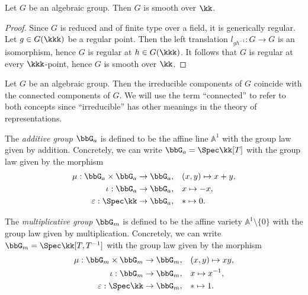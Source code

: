     \begin{proposition}\label{prop:algebraic_group_is_smooth}
        Let \(G\) be an algebraic group.
        Then \(G\) is smooth over \(\kk\).
    \end{proposition}
    \begin{proof}
        Since \(G\) is reduced and of finite type over a field, it is generically regular.
        Let \(g \in G(\kkk)\) be a regular point.
        Then the left translation \(l_{gh^{-1}}: G \to G\) is an isomorphism, hence \(G\) is regular at \(h \in G(\kkk)\).
        It follows that \(G\) is regular at every \(\kkk\)-point, hence \(G\) is smooth over \(\kk\).
    \end{proof}

    \begin{remark}\label{rmk:irreducible_and_connected_components_of_algebraic_group}
        Let \(G\) be an algebraic group.
        Then the irreducible components of \(G\) coincide with the connected components of \(G\).
        We will use the term ``connected'' to refer to both concepts since ``irreducible'' has other meanings in the theory of representations.
    \end{remark}

    \begin{example}\label{eg:additive_group}
        The \emph{additive group} $\bbG_a$ is defined to be the affine line $\mathbb{A}^1$ with the group law given by addition.
        Concretely, we can write $\bbG_a = \Spec \kk[T]$ with the group law given by the morphism
        \begin{align*}
            \mu:\bbG_a \times \bbG_a \to \bbG_a, \quad & (x,y) \mapsto x+y, \\
            \iota:\bbG_a \to \bbG_a, \quad & x \mapsto -x, \\
            \varepsilon:\Spec \kk \to \bbG_a, \quad & * \mapsto 0.
        \end{align*}
    \end{example}

    \begin{example}\label{eg:multiplicative_group}
        The \emph{multiplicative group} $\bbG_m$ is defined to be the affine variety $\mathbb{A}^1 \setminus \{0\}$ with the group law given by multiplication.
        Concretely, we can write $\bbG_m = \Spec \kk[T,T^{-1}]$ with the group law given by the morphism
        \begin{align*}
            \mu: \bbG_m \times \bbG_m \to \bbG_m, \quad & (x,y) \mapsto xy, \\
            \iota: \bbG_m \to \bbG_m, \quad & x \mapsto x^{-1}, \\
            \varepsilon: \Spec \kk \to \bbG_m, \quad & * \mapsto 1.
        \end{align*}
    \end{example}

